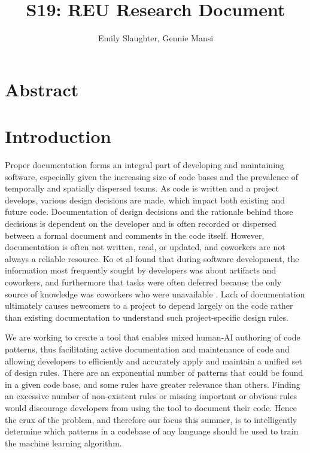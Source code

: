 \documentclass[12pt]{article}
\title{S19: REU Research Document}
\author{Emily Slaughter, Gennie Mansi }
\begin{document}
\maketitle

\clearpage

\tableofcontents

\clearpage

\section{Abstract}



\clearpage
\section{Introduction}

Proper documentation forms an integral part of developing and maintaining software, especially given the increasing size of code bases and the prevalence of temporally and spatially dispersed teams. As code is written and a project develops, various design decisions are made, which impact both existing and future code. Documentation of design decisions and the rationale behind those decisions is dependent on the developer and is often recorded or dispersed between a formal document and comments in the code itself. However, documentation is often not written, read, or updated, and coworkers are not always a reliable resource. Ko et al found that during software development, the information most frequently sought by developers was about artifacts and coworkers, and furthermore that tasks were often deferred because the only source of knowledge was coworkers who were unavailable \cite{KoEtAl2007}. Lack of documentation ultimately causes newcomers to a project to depend largely on the code rather than existing documentation to understand such project-specific design rules.

We are working to create a tool that enables mixed human-AI authoring of code patterns, thus facilitating active documentation and maintenance of code and allowing developers to efficiently and accurately apply and maintain a unified set of design rules. There are an exponential number of patterns that could be found in a given code base, and some rules have greater relevance than others. Finding an excessive number of non-existent rules or missing important or obvious rules would discourage developers from using the tool to document their code. Hence the crux of the problem, and therefore our focus this summer, is to intelligently determine which patterns in a codebase of any language should be used to train the machine learning algorithm.
\end{document}
